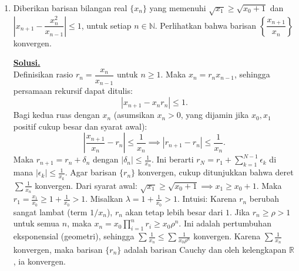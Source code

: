 \documentclass[12pt,twoside]{article}
\newenvironment{solution}
{
	\par\noindent\textbf{\underline{Solusi.}}\\
}
{
	\par
}
\begin{document}
\begin{enumerate}
  \item Diberikan barisan bilangan real $\{x_n\}$ yang memenuhi $\sqrt{x_1}\geq\sqrt{x_0+1}$ dan $\left|x_{n+1}-\dfrac{x_n^2}{x_{n-1}}\right|\leq 1$, untuk setiap $n\in\mathbb{N}$. Perlihatkan bahwa barisan $\left\lbrace   \dfrac{x_{n+1}}{x_n} \right\rbrace$ konvergen.
        \begin{solution}
          Definisikan rasio $r_n = \dfrac{x_n}{x_{n-1}}$ untuk $n \ge 1$.
          Maka $x_n = r_n x_{n-1}$, sehingga persamaan rekursif dapat ditulis:
          $$ \left| x_{n+1} - x_n r_n \right| \le 1. $$
          Bagi kedua ruas dengan $x_n$ (asumsikan $x_n > 0$, yang dijamin jika $x_0, x_1$ positif cukup besar dan syarat awal):
          $$ \left| \frac{x_{n+1}}{x_n} - r_n \right| \le \frac{1}{x_n} \implies \left| r_{n+1} - r_n \right| \le \frac{1}{x_n}. $$
          Maka $r_{n+1} = r_n + \delta_n$ dengan $|\delta_n| \le \frac{1}{x_n}$.
          Ini berarti $r_N = r_1 + \sum_{k=1}^{N-1} \epsilon_k$ di mana $|\epsilon_k| \le \frac{1}{x_k}$.
          Agar barisan $\{r_n\}$ konvergen, cukup ditunjukkan bahwa deret $\sum \frac{1}{x_n}$ konvergen.
          Dari syarat awal: $\sqrt{x_1} \ge \sqrt{x_0+1} \implies x_1 \ge x_0+1$.
          Maka $r_1 = \frac{x_1}{x_0} \ge 1 + \frac{1}{x_0} > 1$.
          Misalkan $\lambda = 1 + \frac{1}{x_0} > 1$.
          Intuisi: Karena $r_n$ berubah sangat lambat (term $1/x_n$), $r_n$ akan tetap lebih besar dari $1$.
          Jika $r_n \ge \rho > 1$ untuk semua $n$, maka $x_n = x_0 \prod_{i=1}^n r_i \ge x_0 \rho^n$.
          Ini adalah pertumbuhan eksponensial (geometri), sehingga $\sum \frac{1}{x_n} \le \sum \frac{1}{x_0 \rho^n}$ konvergen.
          Karena $\sum \frac{1}{x_n}$ konvergen, maka barisan $\{r_n\}$ adalah barisan Cauchy dan oleh kelengkapan $\mathbb{R}$, ia konvergen.
        \end{solution}


\end{enumerate}
\end{document}

